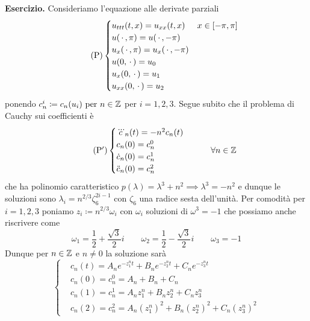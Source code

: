 %
%


\textbf{Esercizio.}
Consideriamo l'equazione alle derivate parziali
\begin{equation}
	\tag{P}
	\begin{cases}
		u_{ttt}(t, x) = u_{xx}(t, x) & x \in [-\pi, \pi] \\
		u(\,\cdot\,, \pi) = u(\,\cdot\,, -\pi) \\
		u_x(\,\cdot\,, \pi) = u_x(\,\cdot\,, -\pi) \\
		u(0, \,\cdot\,) = u_0 \\
		u_{x}(0, \,\cdot\,) = u_1 \\
		u_{xx}(0, \,\cdot\,) = u_2 \\
	\end{cases}
\end{equation}
ponendo $c_n^i \coloneqq c_n(u_i) \text{ per } n \in \mathbb Z$ per $i = 1, 2, 3$. Segue subito che il problema di Cauchy sui coefficienti è
\begin{equation}
	\tag{P$'$}
	\begin{cases}
		\dddot c_n(t) = -n^2c_n(t) \\
		c_n(0) = c_n^0 \\
		\dot c_n(0) = c_n^1 \\
		\ddot c_n(0) = c_n^2 \\
	\end{cases}
	\qquad
	\forall n \in \mathbb Z
\end{equation}
che ha polinomio caratteristico $p(\lambda) = \lambda^3 + n^2 \implies \lambda^3 = -n^2$ e dunque le soluzioni sono $\lambda_i = n^{2/3} \zeta_6^{2i - 1}$ con $\zeta_6$ una radice sesta dell'unità. Per comodità per $i = 1, 2, 3$ poniamo $z_i \coloneqq n^{2/3} \omega_i$ con $\omega_i$ soluzioni di $\omega^3 = -1$ che possiamo anche riscrivere come
$$
\omega_1 = \frac{1}{2} + \frac{\sqrt 3}{2}i
\qquad
\omega_2 = \frac{1}{2} - \frac{\sqrt 3}{2}i
\qquad
\omega_3 = -1
$$
Dunque per $n \in \mathbb Z$ e $n \neq 0$ la soluzione sarà
$$
\left\{
\begin{aligned}
	& c_n(t) = A_n e^{-z_1^n t} + B_n e^{-z_2^n t} + C_n e^{-z_3^n t} \\[1ex]
	& c_n(0) = c_n^0 = A_n + B_n + C_n \\[1ex]
	& c_n(1) = c_n^1 = A_n z_1^n + B_n z_2^n + C_n z_3^n \\[1ex]
	& c_n(2) = c_n^2 = A_n (z_1^n)^2 + B_n (z_2^n)^2 + C_n (z_3^n)^2
\end{aligned}
\right.
$$
